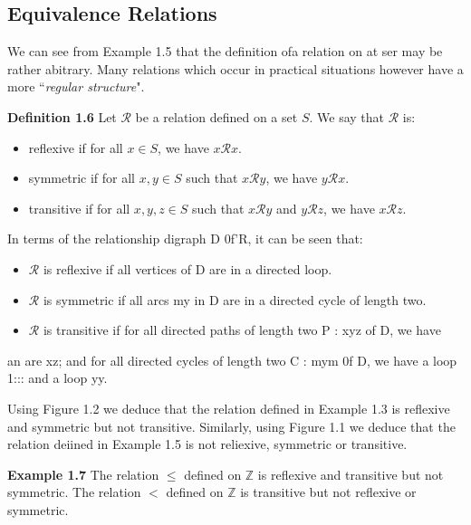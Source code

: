 \subsection*{Equivalence Relations}
We can see from Example 1.5 that the definition ofa relation on at ser may be rather
abitrary. Many relations which occur in practical situations however have a more
``\textit{regular structure}".

\noindent \textbf{Definition 1.6} Let $\mathcal{R}$ be a relation defined on a set $S$. We say that $\mathcal{R}$ is:
\begin{itemize}
\item reflexive if for all $x \in S$, we have $x\mathcal{R}x$.
\item symmetric if for all $x, y \in S$ such that $x\mathcal{R}y$, we have $y\mathcal{R}x$.
\item transitive if for all $x, y, z \in S$ such that $x\mathcal{R}y$ and $y\mathcal{R}z$, we have $x\mathcal{R}z$.
\end{itemize}
In terms of the relationship digraph D 0f'R, it can be seen that:
\begin{itemize}
\item $\mathcal{R}$ is reflexive if all vertices of D are in a directed loop.
\item $\mathcal{R}$ is symmetric if all arcs my in D are in a directed cycle of length two.
\item $\mathcal{R}$ is transitive if for all directed paths of length two P : xyz of D, we have
\end{itemize}
an are xz; and for all directed cycles of length two C : mym 0f D, we have a
loop 1::: and a loop yy.

Using Figure 1.2 we deduce that the relation defined in Example 1.3 is reflexive
and symmetric but not transitive. 
Similarly, using Figure 1.1 we deduce that the
relation deiined in Example 1.5 is not reliexive, symmetric or transitive.

\noindent \textbf{Example 1.7} The relation $\leq $ defined on $\mathbb{Z}$ is reflexive and transitive but not
symmetric. The relation $<$ defined on $\mathbb{Z}$ is transitive but not reflexive or symmetric.
